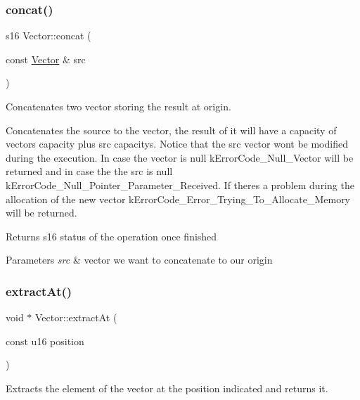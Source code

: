 \subsubsection{\texorpdfstring{concat()}{concat()}}
{\footnotesize\ttfamily s16 Vector\+::concat (\begin{DoxyParamCaption}\item[{const \hyperlink{class_vector}{Vector} \&}]{src }\end{DoxyParamCaption})}



Concatenates two vector storing the result at origin. 

Concatenates the source to the vector, the result of it will have a capacity of vector\textquotesingle{}s capacity plus src capacity\textquotesingle{}s. Notice that the src vector won\textquotesingle{}t be modified during the execution. In case the vector is null k\+Error\+Code\+\_\+\+Null\+\_\+\+Vector will be returned and in case the the src is null k\+Error\+Code\+\_\+\+Null\+\_\+\+Pointer\+\_\+\+Parameter\+\_\+\+Received. If there\textquotesingle{}s a problem during the allocation of the new vector k\+Error\+Code\+\_\+\+Error\+\_\+\+Trying\+\_\+\+To\+\_\+\+Allocate\+\_\+\+Memory will be returned.

\begin{DoxyReturn}{Returns}
s16 status of the operation once finished 
\end{DoxyReturn}

\begin{DoxyParams}{Parameters}
{\em src} & vector we want to concatenate to our origin \\
\hline
\end{DoxyParams}
\mbox{\label{class_vector_aae8d43ca6747949bfe322c71d961c9a6}} 
\subsubsection{\texorpdfstring{extract\+At()}{extractAt()}}
{\footnotesize\ttfamily void $\ast$ Vector\+::extract\+At (\begin{DoxyParamCaption}\item[{const u16}]{position }\end{DoxyParamCaption})}



Extracts the element of the vector at the position indicated and returns it. 

